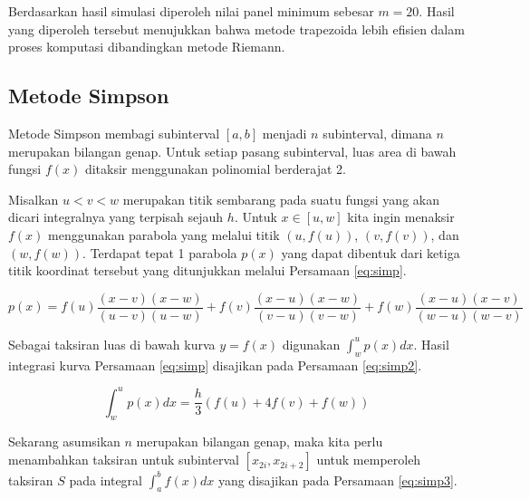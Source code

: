 \documentclass[]{book}
\theoremstyle{definition}
\theoremstyle{definition}
\theoremstyle{definition}
\theoremstyle{remark}
\begin{document}
Berdasarkan hasil simulasi diperoleh nilai panel minimum sebesar \(m=20\). Hasil yang diperoleh tersebut menujukkan bahwa metode trapezoida lebih efisien dalam proses komputasi dibandingkan metode Riemann.

\hypertarget{simpson}{%
\subsection{Metode Simpson}\label{simpson}}

Metode Simpson membagi subinterval \(\left[a,b\right]\) menjadi
\(n\) subinterval, dimana \(n\) merupakan bilangan genap. Untuk setiap pasang subinterval, luas area di bawah fungsi \(f\left(x\right)\) ditaksir menggunakan polinomial berderajat 2.

Misalkan \(u<v<w\) merupakan titik sembarang pada suatu fungsi yang akan dicari integralnya yang terpisah sejauh \(h\). Untuk \(x\in\left[u,w\right]\) kita ingin menaksir \(f\left(x\right)\) menggunakan parabola yang melalui titik \(\left(u, f\left(u\right)\right)\), \(\left(v, f\left(v\right)\right)\), dan \(\left(w, f\left(w\right)\right)\). Terdapat tepat 1 parabola \(p\left(x\right)\) yang dapat dibentuk dari ketiga titik koordinat tersebut yang ditunjukkan melalui Persamaan \eqref{eq:simp}.

\begin{equation}
p\left(x\right)=f\left(u\right)\frac{\left(x-v\right)\left(x-w\right)}{\left(u-v\right)\left(u-w\right)}+f\left(v\right)\frac{\left(x-u\right)\left(x-w\right)}{\left(v-u\right)\left(v-w\right)}+f\left(w\right)\frac{\left(x-u\right)\left(x-v\right)}{\left(w-u\right)\left(w-v\right)}
  \label{eq:simp}
\end{equation}

Sebagai taksiran luas di bawah kurva \(y=f\left(x\right)\) digunakan \(\int_{w}^u p\left(x\right)dx\). Hasil integrasi kurva Persamaan \eqref{eq:simp} disajikan pada Persamaan \eqref{eq:simp2}.

\begin{equation}
\int_w^up\left(x\right)dx=\frac{h}{3}\left(f\left(u\right)+4f\left(v\right)+f\left(w\right)\right)
  \label{eq:simp2}
\end{equation}

Sekarang asumsikan \(n\) merupakan bilangan genap, maka kita perlu menambahkan taksiran untuk subinterval \(\left[x_{2i},x_{2i+2}\right]\) untuk memperoleh taksiran \(S\) pada integral \(\int_{a}^b f\left(x\right)dx\) yang disajikan pada Persamaan \eqref{eq:simp3}.
\end{document}
